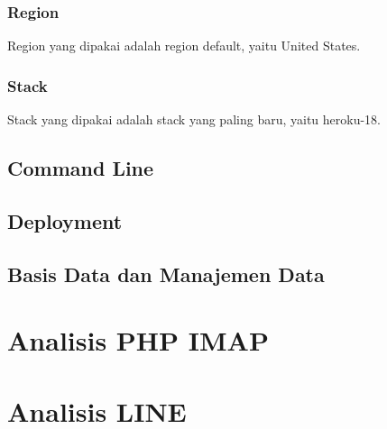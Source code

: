\subsubsection{Region}
Region yang dipakai adalah region default, yaitu United States.

\subsubsection{Stack}
Stack yang dipakai adalah stack yang paling baru, yaitu heroku-18.

\subsection{Command Line}

\subsection{Deployment}

\subsection{Basis Data dan Manajemen Data}

\section{Analisis PHP IMAP}
\label{sec:analisisimap}

\section{Analisis LINE}
\label{sec:analisisline}